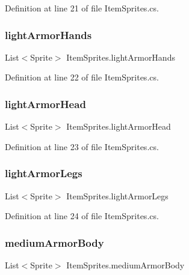 Definition at line 21 of file Item\+Sprites.\+cs.

\mbox{\label{class_item_sprites_a4e06ca96512e96e68c2087811a770ad2}} 
\subsubsection{\texorpdfstring{lightArmorHands}{lightArmorHands}}
{\footnotesize\ttfamily List$<$Sprite$>$ Item\+Sprites.\+light\+Armor\+Hands}



Definition at line 22 of file Item\+Sprites.\+cs.

\mbox{\label{class_item_sprites_a8ebd65ff9425936892202e9112bb1887}} 
\subsubsection{\texorpdfstring{lightArmorHead}{lightArmorHead}}
{\footnotesize\ttfamily List$<$Sprite$>$ Item\+Sprites.\+light\+Armor\+Head}



Definition at line 23 of file Item\+Sprites.\+cs.

\mbox{\label{class_item_sprites_a456306becfba506b7560b25be43d97cf}} 
\subsubsection{\texorpdfstring{lightArmorLegs}{lightArmorLegs}}
{\footnotesize\ttfamily List$<$Sprite$>$ Item\+Sprites.\+light\+Armor\+Legs}



Definition at line 24 of file Item\+Sprites.\+cs.

\mbox{\label{class_item_sprites_a6384680172497096a3ec7a5b251c0d8d}} 
\subsubsection{\texorpdfstring{mediumArmorBody}{mediumArmorBody}}
{\footnotesize\ttfamily List$<$Sprite$>$ Item\+Sprites.\+medium\+Armor\+Body}



